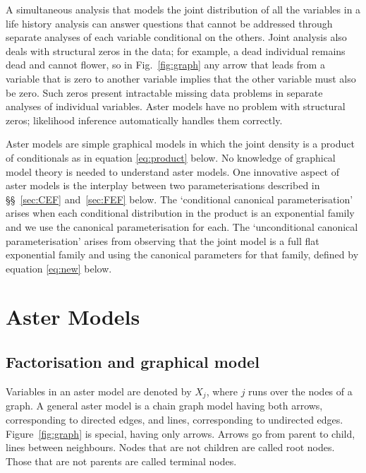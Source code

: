 A simultaneous analysis that models the joint distribution of
all the variables in a life history analysis
can answer questions that cannot be addressed through separate
analyses of each variable conditional on the others.
Joint analysis also deals with structural zeros in the data;
for example, a dead individual remains dead and cannot flower,
so in Fig.~\ref{fig:graph} any arrow that leads from a variable that is zero
to another variable implies that the other variable
must also be zero.
Such zeros
present intractable missing data problems in separate analyses
of individual variables.  Aster models have no problem with structural
zeros; likelihood inference automatically handles them correctly.

Aster models are simple graphical models
\citep[\S~3.2.3]{lauritzen}
in which the joint density is a product of conditionals as in
equation \eqref{eq:product} below.  No knowledge of graphical
model theory is needed to understand aster models.
One innovative aspect of aster models is the interplay between two
parameterisations described
in \S\S~\ref{sec:CEF} and~\ref{sec:FEF} below.
The `conditional canonical parameterisation'
arises when each conditional distribution in the product
is an exponential family and we
use the canonical parameterisation for each.
The `unconditional canonical parameterisation'
arises from observing that the joint model is a full flat exponential family
\citep[Ch.~8]{barndorff} and using the canonical parameters for that
family, defined by equation \eqref{eq:new} below.

\section{Aster Models}

\subsection{Factorisation and graphical model}

Variables in an aster model are denoted by $X_j$, where $j$ runs over the nodes
of a graph.
A general aster model is a chain graph model \citep[pp.~7, 53]{lauritzen}
having both arrows, corresponding to directed edges, and lines, corresponding
to undirected edges.
Figure~\ref{fig:graph} is special, having only arrows.
Arrows go from parent to child, lines between neighbours.
Nodes that are not children are called root nodes.
Those that are not parents are called terminal nodes.

